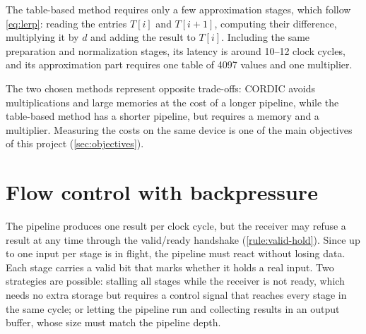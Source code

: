 The table-based method requires only a few approximation stages, which follow \cref{eq:lerp}: reading the
entries $T[i]$ and $T[i+1]$, computing their difference, multiplying it by $d$ and adding the result to
$T[i]$. Including the same preparation and normalization stages, its latency
is around 10--12 clock cycles, and its approximation part requires one table
of 4097 values and one multiplier.

The two chosen methods represent opposite trade-offs: CORDIC avoids
multiplications and large memories at the cost of a longer pipeline, while
the table-based method has a shorter pipeline, but requires a memory and a
multiplier. Measuring the costs on the same device is one of the main objectives of this project
(\cref{sec:objectives}).

\section{Flow control with backpressure}
\label{sec:backpressure}

The pipeline produces one result per clock cycle, but the receiver may
refuse a result at any time through the valid/ready handshake
(\cref{rule:valid-hold}). Since up to one input per stage is in flight, the
pipeline must react without losing data. Each stage carries a valid bit that
marks whether it holds a real input. Two strategies are possible: stalling
all stages while the receiver is not ready, which needs no extra storage but
requires a control signal that reaches every stage in the same cycle; or
letting the pipeline run and collecting results in an output buffer, whose
size must match the pipeline depth.